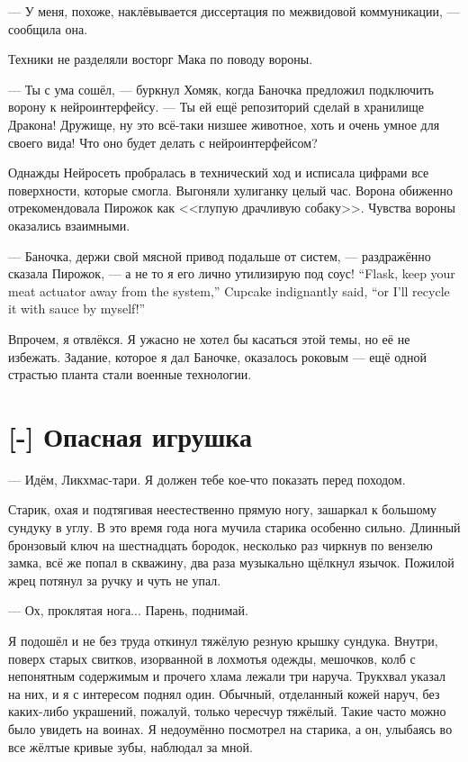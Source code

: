--- У меня, похоже, наклёвывается диссертация по межвидовой коммуникации, --- сообщила она.

Техники не разделяли восторг Мака по поводу вороны.

--- Ты с ума сошёл, --- буркнул Хомяк, когда Баночка предложил подключить ворону к нейроинтерфейсу.
--- Ты ей ещё репозиторий сделай в хранилище Дракона!
Дружище, ну это всё-таки низшее животное, хоть и очень умное для своего вида!
Что оно будет делать с нейроинтерфейсом?

Однажды Нейросеть пробралась в технический ход и исписала цифрами все поверхности, которые смогла.
Выгоняли хулиганку целый час.
Ворона обиженно отрекомендовала Пирожок как <<глупую драчливую собаку>>.
Чувства вороны оказались взаимными.

{--- Баночка, держи свой мясной привод подальше от систем, --- раздражённо сказала Пирожок, --- а не то я его лично утилизирую под соус!}
{``Flask, keep your meat actuator away from the system,'' Cupcake indignantly said, ``or I'll recycle it with sauce by myself!''}

Впрочем, я отвлёкся.
Я ужасно не хотел бы касаться этой темы, но её не избежать.
Задание, которое я дал Баночке, оказалось роковым --- ещё одной страстью планта стали военные технологии.

\section{[-] Опасная игрушка}


\textspace

--- Идём, Ликхмас-тари. Я должен тебе кое-что показать перед походом.

Старик, охая и подтягивая неестественно прямую ногу, зашаркал к большому сундуку в углу.
В это время года нога мучила старика особенно сильно.
Длинный бронзовый ключ на шестнадцать бородок, несколько раз чиркнув по вензелю замка, всё же попал в скважину, два раза музыкально щёлкнул язычок.
Пожилой жрец потянул за ручку и чуть не упал.

--- Ох, проклятая нога...
Парень, поднимай.

Я подошёл и не без труда откинул тяжёлую резную крышку сундука.
Внутри, поверх старых свитков, изорванной в лохмотья одежды, мешочков, колб с непонятным содержимым и прочего хлама лежали три наруча.
Трукхвал указал на них, и я с интересом поднял один.
Обычный, отделанный кожей наруч, без каких-либо украшений, пожалуй, только чересчур тяжёлый.
Такие часто можно было увидеть на воинах.
Я недоумённо посмотрел на старика, а он, улыбаясь во все жёлтые кривые зубы, наблюдал за мной.

